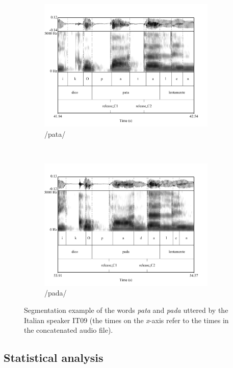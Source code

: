 \documentclass[12pt,]{article}
\begin{document}
\begin{figure}
  \centering
  \begin{subfigure}[t]{0.5\textwidth}
    \centering
    \includegraphics[height=2.5in]{img/Figure1a.pdf}
    \caption{/pata/}
  \end{subfigure}%
  ~
  \begin{subfigure}[t]{0.5\textwidth}
    \centering
    \includegraphics[height=2.5in]{img/Figure1b.pdf}
    \caption{/pada/}
  \end{subfigure}
  \caption{Segmentation example of the words \textit{pata} and \textit{pada} uttered by the Italian speaker IT09 (the times on the \textit{x}-axis refer to the times in the concatenated audio file).}
\end{figure}

\hypertarget{statistical-analysis}{%
\subsection{Statistical analysis}\label{statistical-analysis}}
\end{document}

